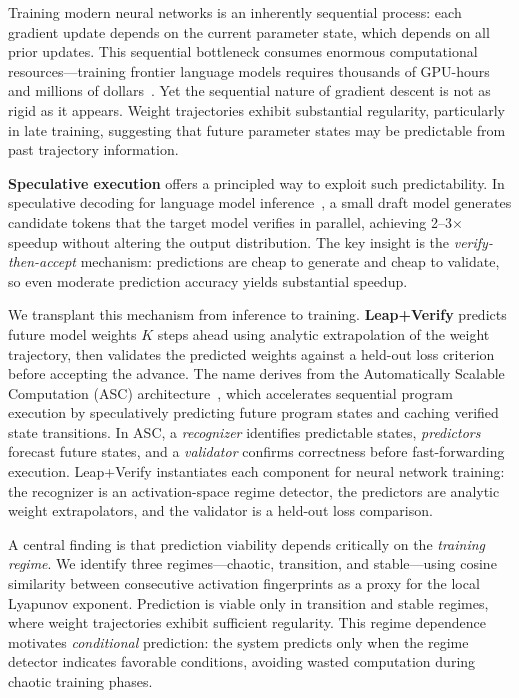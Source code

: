\documentclass{article}
\begin{document}
Training modern neural networks is an inherently sequential process: each gradient update depends on the current parameter state, which depends on all prior updates.
This sequential bottleneck consumes enormous computational resources---training frontier language models requires thousands of GPU-hours and millions of dollars~\citep{kaplan2020scaling}.
Yet the sequential nature of gradient descent is not as rigid as it appears.
Weight trajectories exhibit substantial regularity, particularly in late training, suggesting that future parameter states may be predictable from past trajectory information.

\textbf{Speculative execution} offers a principled way to exploit such predictability.
In speculative decoding for language model inference~\citep{leviathan2023fast,chen2023accelerating}, a small draft model generates candidate tokens that the target model verifies in parallel, achieving 2--3$\times$ speedup without altering the output distribution.
The key insight is the \emph{verify-then-accept} mechanism: predictions are cheap to generate and cheap to validate, so even moderate prediction accuracy yields substantial speedup.

We transplant this mechanism from inference to training.
\textbf{Leap+Verify} predicts future model weights $K$ steps ahead using analytic extrapolation of the weight trajectory, then validates the predicted weights against a held-out loss criterion before accepting the advance.
The name derives from the Automatically Scalable Computation (ASC) architecture~\citep{waterland2014asc}, which accelerates sequential program execution by speculatively predicting future program states and caching verified state transitions.
In ASC, a \emph{recognizer} identifies predictable states, \emph{predictors} forecast future states, and a \emph{validator} confirms correctness before fast-forwarding execution.
Leap+Verify instantiates each component for neural network training: the recognizer is an activation-space regime detector, the predictors are analytic weight extrapolators, and the validator is a held-out loss comparison.

A central finding is that prediction viability depends critically on the \emph{training regime}.
We identify three regimes---chaotic, transition, and stable---using cosine similarity between consecutive activation fingerprints as a proxy for the local Lyapunov exponent.
Prediction is viable only in transition and stable regimes, where weight trajectories exhibit sufficient regularity.
This regime dependence motivates \emph{conditional} prediction: the system predicts only when the regime detector indicates favorable conditions, avoiding wasted computation during chaotic training phases.
\end{document}
